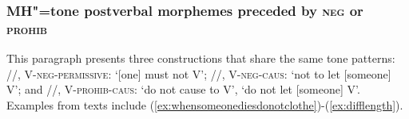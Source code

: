\subsubsection{MH"=tone postverbal morphemes preceded by \textsc{neg} or \textsc{prohib}}

This paragraph presents three constructions that share the same tone patterns: //, V-\textsc{neg}-\textsc{permissive}:  ‘[one] must not V’; //, V-\textsc{neg}-\textsc{caus}: ‘not to let [someone] V’; and //, V-\textsc{prohib}-\textsc{caus}: ‘do not cause to V’, ‘do not let [someone] V’. Examples from texts include (\ref{ex:whensomeonediesdonotclothe})-(\ref{ex:difflength}).


